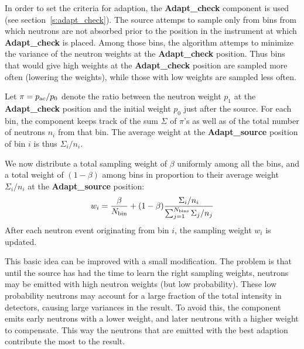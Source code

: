 In order to set the criteria for adaption, the {\bf Adapt\_check} component is
used (see section~\ref{s:adapt_check}). The source attemps to sample
only from bins from which neutrons are not absorbed prior to the
position in the instrument at which {\bf Adapt\_check} is
placed. Among those bins, the algorithm attemps to minimize the variance
of the neutron weights at the {\bf Adapt\_check} position. Thus bins that
would give high weights at the {\bf Adapt\_check} position are sampled more
often (lowering the weights), while those with low weights are sampled
less often.

Let $\pi = p_{\rm ac}/p_0$ denote the ratio between the neutron weight $p_1$ at
the {\bf Adapt\_check} position and the initial weight $p_0$ just after the
source. For each bin, the component keeps track of the sum $\Sigma$ of
$\pi$'s as well as of the total number of neutrons $n_i$ from that
bin. The average weight at the {\bf Adapt\_source} position of bin $i$ is thus
$\Sigma_i/n_i$.

We now distribute a total sampling weight of $\beta$ uniformly
among all the bins, and a total weight of $(1 - \beta)$ among bins in
proportion to their average weight $\Sigma_i/n_i$ at the {\bf Adapt\_source}
position:
\begin{equation}
w_i = \frac{\beta}{N_{\rm bin}} +
    (1-\beta) \frac{\Sigma_i/n_i}{\sum_{j=1}^{N_{\rm bins}} \Sigma_j/n_j}
\end{equation}
After each neutron event originating from bin $i$, the sampling weight $w_i$
is updated.

This basic idea can be improved with a small modification. The problem
is that until the source has had the time to learn the right sampling
weights, neutrons may be emitted with high neutron weights (but low
probability). These low probability neutrons may account for a large fraction of
the total intensity in detectors, causing large variances in the
result. To avoid this, the component emits early neutrons with a lower
weight, and later neutrons with a higher weight to compensate. This way
the neutrons that are emitted with the best adaption contribute the most
to the result.

